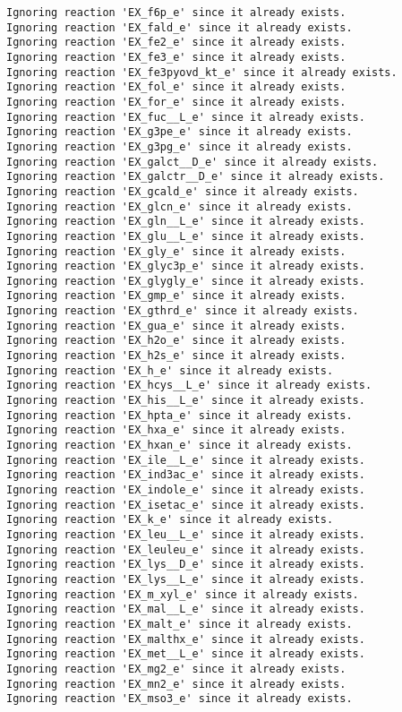 \documentclass[
  letterpaper,
  DIV=11,
  numbers=noendperiod]{scrartcl}
\begin{document}
\begin{verbatim}
Ignoring reaction 'EX_f6p_e' since it already exists.
Ignoring reaction 'EX_fald_e' since it already exists.
Ignoring reaction 'EX_fe2_e' since it already exists.
Ignoring reaction 'EX_fe3_e' since it already exists.
Ignoring reaction 'EX_fe3pyovd_kt_e' since it already exists.
Ignoring reaction 'EX_fol_e' since it already exists.
Ignoring reaction 'EX_for_e' since it already exists.
Ignoring reaction 'EX_fuc__L_e' since it already exists.
Ignoring reaction 'EX_g3pe_e' since it already exists.
Ignoring reaction 'EX_g3pg_e' since it already exists.
Ignoring reaction 'EX_galct__D_e' since it already exists.
Ignoring reaction 'EX_galctr__D_e' since it already exists.
Ignoring reaction 'EX_gcald_e' since it already exists.
Ignoring reaction 'EX_glcn_e' since it already exists.
Ignoring reaction 'EX_gln__L_e' since it already exists.
Ignoring reaction 'EX_glu__L_e' since it already exists.
Ignoring reaction 'EX_gly_e' since it already exists.
Ignoring reaction 'EX_glyc3p_e' since it already exists.
Ignoring reaction 'EX_glygly_e' since it already exists.
Ignoring reaction 'EX_gmp_e' since it already exists.
Ignoring reaction 'EX_gthrd_e' since it already exists.
Ignoring reaction 'EX_gua_e' since it already exists.
Ignoring reaction 'EX_h2o_e' since it already exists.
Ignoring reaction 'EX_h2s_e' since it already exists.
Ignoring reaction 'EX_h_e' since it already exists.
Ignoring reaction 'EX_hcys__L_e' since it already exists.
Ignoring reaction 'EX_his__L_e' since it already exists.
Ignoring reaction 'EX_hpta_e' since it already exists.
Ignoring reaction 'EX_hxa_e' since it already exists.
Ignoring reaction 'EX_hxan_e' since it already exists.
Ignoring reaction 'EX_ile__L_e' since it already exists.
Ignoring reaction 'EX_ind3ac_e' since it already exists.
Ignoring reaction 'EX_indole_e' since it already exists.
Ignoring reaction 'EX_isetac_e' since it already exists.
Ignoring reaction 'EX_k_e' since it already exists.
Ignoring reaction 'EX_leu__L_e' since it already exists.
Ignoring reaction 'EX_leuleu_e' since it already exists.
Ignoring reaction 'EX_lys__D_e' since it already exists.
Ignoring reaction 'EX_lys__L_e' since it already exists.
Ignoring reaction 'EX_m_xyl_e' since it already exists.
Ignoring reaction 'EX_mal__L_e' since it already exists.
Ignoring reaction 'EX_malt_e' since it already exists.
Ignoring reaction 'EX_malthx_e' since it already exists.
Ignoring reaction 'EX_met__L_e' since it already exists.
Ignoring reaction 'EX_mg2_e' since it already exists.
Ignoring reaction 'EX_mn2_e' since it already exists.
Ignoring reaction 'EX_mso3_e' since it already exists.

\end{verbatim}
\end{document}
